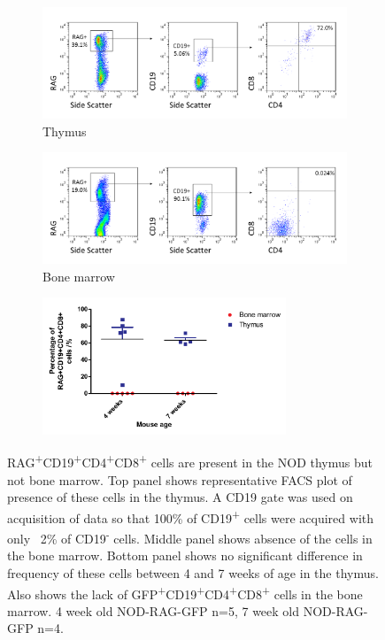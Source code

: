 \begin{figure}	
	\begin{subfigure}{\textwidth}
	\includegraphics[width=\textwidth]{Figures/Thymus1RAGCD19DP.png}
	\caption{Thymus}
	\label{subfig:ThyRAGCD19DP}
	\end{subfigure}
	\begin{subfigure}{\textwidth}
	\includegraphics[width=\textwidth]{Figures/BM1RAGCD19DP.png}
	\caption{Bone marrow}
	\label{subfig:BMRAGCD19DP}
	\end{subfigure}
	\begin{subfigure}{\textwidth}
	\centering
	\includegraphics[width=0.8\textwidth]{Figures/BMvThyDP.pdf}
	\caption{}
	\label{BMvThyDPgraph}
	\end{subfigure}
\caption[There are GFP\textsuperscript{+}CD19\textsuperscript{+}CD4\textsuperscript{+}CD8\textsuperscript{+} cells present in the NOD thymus] {RAG\textsuperscript{+}CD19\textsuperscript{+}CD4\textsuperscript{+}CD8\textsuperscript{+} cells are present in the NOD thymus but not bone marrow.
Top panel shows representative FACS plot of presence of these cells in the thymus. A CD19 gate was used on acquisition of data so that 100\% of CD19\textsuperscript{+} cells were acquired with only ~2\% of CD19\textsuperscript{-} cells.
Middle panel shows absence of the cells in the bone marrow.
Bottom panel shows no significant difference in frequency of these cells between 4 and 7 weeks of age in the thymus.
Also shows the lack of GFP\textsuperscript{+}CD19\textsuperscript{+}CD4\textsuperscript{+}CD8\textsuperscript{+} cells in the bone marrow.
4 week old NOD-RAG-GFP n=5, 7 week old NOD-RAG-GFP n=4.}
\label{fig:RAGCD19DP}
\end{figure}


